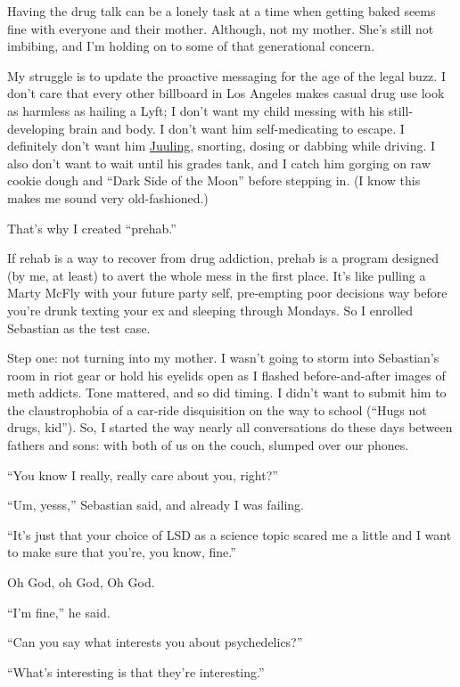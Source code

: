 Having the drug talk can be a lonely task at a time when getting baked
seems fine with everyone and their mother. Although, not my mother.
She's still not imbibing, and I'm holding on to some of that
generational concern.

My struggle is to update the proactive messaging for the age of the
legal buzz. I don't care that every other billboard in Los Angeles makes
casual drug use look as harmless as hailing a Lyft; I don't want my
child messing with his still-developing brain and body. I don't want him
self-medicating to escape. I definitely don't want him
\href{https://www.nytimes3xbfgragh.onion/2018/04/07/style/the-juul-is-too-cool.html}{Juuling},
snorting, dosing or dabbing while driving. I also don't want to wait
until his grades tank, and I catch him gorging on raw cookie dough and
``Dark Side of the Moon'' before stepping in. (I know this makes me
sound very old-fashioned.)

That's why I created ``prehab.''

If rehab is a way to recover from drug addiction, prehab is a program
designed (by me, at least) to avert the whole mess in the first place.
It's like pulling a Marty McFly with your future party self, pre-empting
poor decisions way before you're drunk texting your ex and sleeping
through Mondays. So I enrolled Sebastian as the test case.

Step one: not turning into my mother. I wasn't going to storm into
Sebastian's room in riot gear or hold his eyelids open as I flashed
before-and-after images of meth addicts. Tone mattered, and so did
timing. I didn't want to submit him to the claustrophobia of a car-ride
disquisition on the way to school (``Hugs not drugs, kid''). So, I
started the way nearly all conversations do these days between fathers
and sons: with both of us on the couch, slumped over our phones.

``You know I really, really care about you, right?''

``Um, yesss,'' Sebastian said, and already I was failing.

``It's just that your choice of LSD as a science topic scared me a
little and I want to make sure that you're, you know, fine.''

Oh God, oh God, Oh God.

``I'm fine,'' he said.

``Can you say what interests you about psychedelics?''

``What's interesting is that they're interesting.''

